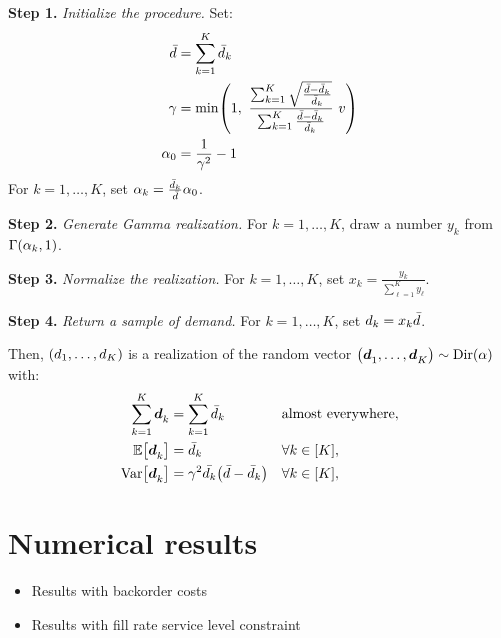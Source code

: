 \textbf{Step 1.} \emph{Initialize the procedure.}
Set:
\begin{subequations}
  \begin{align*}
    \bar{\demand} &= \sum_{k=1}^K\bar{\demand}_k
    \\
    \gamma &= \min \bracket{1,\
    \frac
    {\sum_{k=1}^K\sqrt{\frac{\bar{\demand}-\bar{\demand}_k}{\bar{\demand}_k}}}{\sum_{k=1}^K\frac{\bar{\demand}-\bar{\demand}_k}{\bar{\demand}_k}}\ v}
    \\
    \alpha_0 &= \frac{1}{\gamma^2}-1
  \end{align*}
\end{subequations}
For $k=1,\ldots,K$, set $\alpha_k=\frac{\bar{d}_k}{\bar{d}}\alpha_0$.

\textbf{Step 2.} \emph{Generate Gamma realization.}
For $k=1,\ldots,K$, draw a number $y_k$ from $\Gamma\bracket{\alpha_k,1}$.

\textbf{Step 3.} \emph{Normalize the realization.}
For $k=1,\ldots,K$, set $x_k=\frac{y_k}{\sum_{\ell=1}^K y_{\ell}}$.

\textbf{Step 4.} \emph{Return a sample of demand.}
For $k=1,\ldots,K$, set $d_k = x_k \bar{d}$.

Then, $\bracket{\demand_1,\ldots,\demand_K}$ is a realization of the random vector $\bracket{\va\demand_1,\ldots,\va\demand_K}\sim\Dir\bracket{\alpha}$ with:
\begin{subequations}
  \begin{align}
    \sum_{k=1}^K \va\demand_k &= \sum_{k=1}^K \bar{\demand}_k && \mbox{almost everywhere},
    \\
    \espe\sqbracket{\va\demand_k} &= \bar{\demand}_k && \forall k\in\range{K},
    \\
    \vari\sqbracket{\va\demand_k} &= \gamma^2\bar{\demand_k}\bracket{\bar{\demand}-\bar{\demand}_k} && \forall k\in\range{K},
  \end{align}
\end{subequations}



\section{Numerical results}



\begin{itemize}
  \item Results with backorder costs
  \item Results with fill rate service level constraint
\end{itemize}
